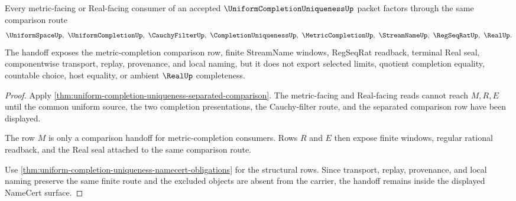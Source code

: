 \begin{theorem}
\label{thm:uniform-completion-uniqueness-real-metric-handoff}
Every metric-facing or Real-facing consumer of an accepted $\UniformCompletionUniquenessUp$ packet factors through the same comparison route
$$
\UniformSpaceUp,\ \UniformCompletionUp,\ \CauchyFilterUp,\ \CompletionUniquenessUp,\ \MetricCompletionUp,\ \StreamNameUp,\ \RegSeqRatUp,\ \RealUp .
$$
The handoff exposes the metric-completion comparison row, finite StreamName windows, RegSeqRat readback, terminal Real seal, componentwise transport, replay, provenance, and local naming, but it does not export selected limits, quotient completion equality, countable choice, host equality, or ambient $\RealUp$ completeness.
\end{theorem}
\begin{proof}
Apply \autoref{thm:uniform-completion-uniqueness-separated-comparison}. The metric-facing and Real-facing reads cannot reach $M,R,E$ until the common uniform source, the two completion presentations, the Cauchy-filter route, and the separated comparison row have been displayed.

The row $M$ is only a comparison handoff for metric-completion consumers. Rows $R$ and $E$ then expose finite windows, regular rational readback, and the Real seal attached to the same comparison route.

Use \autoref{thm:uniform-completion-uniqueness-namecert-obligations} for the structural rows. Since transport, replay, provenance, and local naming preserve the same finite route and the excluded objects are absent from the carrier, the handoff remains inside the displayed NameCert surface.
\end{proof}



